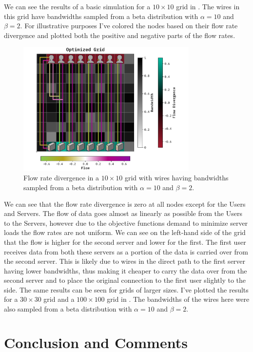\documentclass[10pt, titlepage, a4paper]{article}
\begin{document}
We can see the results of a basic simulation for a $10\times 10$ grid in \textcolor{red}{}. The wires 
in this grid have bandwidths sampled from a beta distribution with $\alpha = 10$ and $\beta = 2$. For illustrative purposes
I've colored the nodes based on their flow rate divergence and plotted both the positive and negative parts of the 
flow rates.

\begin{figure}[H]
    \centering
    \includegraphics[width=0.8\textwidth]{../Images/optimize-case-10.pdf}
    \caption{Flow rate divergence in a $10\times 10$ grid with wires having bandwidths sampled from a beta distribution with $\alpha = 10$ and $\beta = 2$.}
    \label{fig:basic_grid}
\end{figure}

We can see that the flow rate divergence is zero at all nodes except for the Users and Servers. The flow of data goes almost 
as linearly as possible from the Users to the Servers, however due to the objective functions demand to minimize server loads 
the flow rates are not uniform. We can see on the left-hand side of the grid that the flow is higher for the second server and lower 
for the first. The first user receives data from both these servers as a portion of the data is carried over from the second 
server. This is likely due to wires in the direct path to the first server having lower bandwidths, thus making it cheaper 
to carry the data over from the second server and to place the original connection to the first user slightly to the side. 
The same results can be seen for grids of larger sizes. I've plotted the results for a $30\times 30$ grid and 
a $100\times 100$ grid in \textcolor{red}{}. The bandwidths of the wires here were also sampled from a beta distribution
with $\alpha = 10$ and $\beta = 2$.


\section{Conclusion and Comments}

% 
% 

\end{document}
